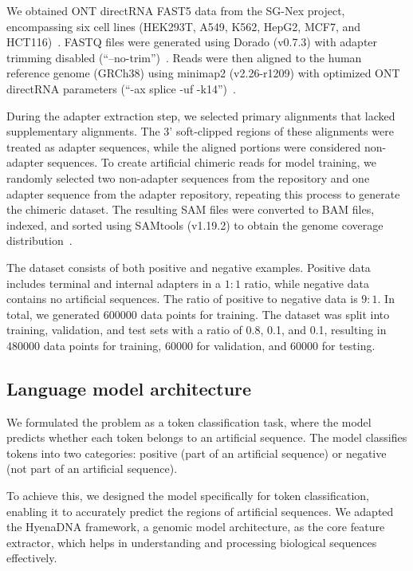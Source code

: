\documentclass[pdflatex, sn-mathphys-num, lineno]{sn-jnl}%
\theoremstyle{thmstyleone}%
\theoremstyle{thmstyletwo}%
\theoremstyle{thmstylethree}%
\begin{document}
We obtained ONT directRNA FAST5 data from the SG-Nex project, encompassing six cell lines (HEK293T, A549, K562, HepG2, MCF7, and HCT116)~\cite{chen2021systematic}.
FASTQ files were generated using Dorado (v0.7.3) with adapter trimming disabled (``--no-trim'')~\cite{dorado2023}.
Reads were then aligned to the human reference genome (GRCh38) using minimap2 (v2.26-r1209) with optimized ONT directRNA parameters (``-ax splice -uf -k14'')~\cite{li2018minimap2}.

During the adapter extraction step, we selected primary alignments that lacked supplementary alignments.
The 3' soft-clipped regions of these alignments were treated as adapter sequences, while the aligned portions were considered non-adapter sequences.
To create artificial chimeric reads for model training, we randomly selected two non-adapter sequences from the repository and one adapter sequence from the adapter repository, repeating this process to generate the chimeric dataset.
The resulting SAM files were converted to BAM files, indexed, and sorted using SAMtools (v1.19.2) to obtain the genome coverage distribution~\cite{li2009sequence}.


The dataset consists of both positive and negative examples.
Positive data includes terminal and internal adapters in a \( 1:1 \) ratio, while negative data contains no artificial sequences.
The ratio of positive to negative data is \( 9:1 \).
In total, we generated \num{600000} data points for training.
The dataset was split into training, validation, and test sets with a ratio of  \num{0.8}, \num{0.1}, and \num{0.1}, resulting in \num{480000} data points for training, \num{60000} for validation, and \num{60000} for testing.


\subsection{Language model architecture}\label{ssec:lm}

We formulated the problem as a token classification task, where the model predicts whether each token belongs to an artificial sequence.
The model classifies tokens into two categories: positive (part of an artificial sequence) or negative (not part of an artificial sequence).

To achieve this, we designed the model specifically for token classification, enabling it to accurately predict the regions of artificial sequences.
We adapted the HyenaDNA framework, a genomic model architecture, as the core feature extractor, which helps in understanding and processing biological sequences effectively.
\end{document}
